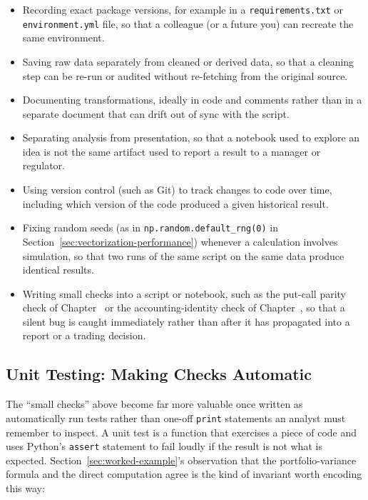 \documentclass[../ai_in_finance]{subfiles}
\begin{document}
\begin{itemize}
    \item Recording exact package versions, for example in a \texttt{requirements.txt} or \texttt{environment.yml} file, so that a colleague (or a future you) can recreate the same environment.
    \item Saving raw data separately from cleaned or derived data, so that a cleaning step can be re-run or audited without re-fetching from the original source.
    \item Documenting transformations, ideally in code and comments rather than in a separate document that can drift out of sync with the script.
    \item Separating analysis from presentation, so that a notebook used to explore an idea is not the same artifact used to report a result to a manager or regulator.
    \item Using version control (such as Git) to track changes to code over time, including which version of the code produced a given historical result.
    \item Fixing random seeds (as in \texttt{np.random.default\_rng(0)} in Section~\ref{sec:vectorization-performance}) whenever a calculation involves simulation, so that two runs of the same script on the same data produce identical results.
    \item Writing small checks into a script or notebook, such as the put-call parity check of Chapter~ or the accounting-identity check of Chapter~, so that a silent bug is caught immediately rather than after it has propagated into a report or a trading decision.
\end{itemize}

\subsection{Unit Testing: Making Checks Automatic}
\label{sec:unit-testing}

The ``small checks'' above become far more valuable once written as automatically run tests rather than one-off \texttt{print} statements an analyst must remember to inspect. A unit test is a function that exercises a piece of code and uses Python's \texttt{assert} statement to fail loudly if the result is not what is expected. Section~\ref{sec:worked-example}'s observation that the portfolio-variance formula and the direct computation agree is the kind of invariant worth encoding this way:
\end{document}
